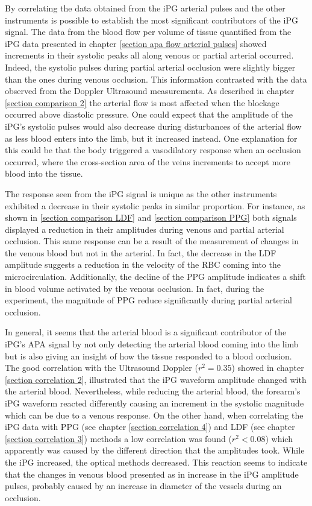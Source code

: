 By correlating the data obtained from the iPG arterial pulses and the other instruments is possible to establish the most significant contributors of the iPG signal. The data from the blood flow per volume of tissue quantified from the iPG data presented in chapter \ref{section apa flow arterial pulses} showed increments in their systolic peaks all along venous or partial arterial occurred. Indeed, the systolic pulses during partial arterial occlusion were slightly bigger than the ones during venous occlusion. This information contrasted with the data observed from the Doppler Ultrasound measurements. As described in chapter \ref{section comparison 2} the arterial flow is most affected when the blockage occurred above diastolic pressure. One could expect that the amplitude of the iPG's systolic pulses would also decrease during disturbances of the arterial flow as less blood enters into the limb, but it increased instead. One explanation for this could be that the body triggered a vasodilatory response when an occlusion occurred, where the cross-section area of the veins increments to accept more blood into the tissue. 

The response seen from the iPG signal is unique as the other instruments exhibited a decrease in their systolic peaks in similar proportion. For instance, as shown in \ref{section comparison LDF} and \ref{section comparison PPG} both signals displayed a reduction in their amplitudes during venous and partial arterial occlusion. This same response can be a result of the measurement of changes in the venous blood but not in the arterial. In fact, the decrease in the LDF amplitude suggests a reduction in the velocity of the RBC coming into the microcirculation. Additionally, the decline of the PPG amplitude indicates a shift in blood volume activated by the venous occlusion. In fact, during the experiment, the magnitude of PPG reduce significantly during partial arterial occlusion.

In general, it seems that the arterial blood is a significant contributor of the iPG's APA signal by not only detecting the arterial blood coming into the limb but is also giving an insight of how the tissue responded to a blood occlusion. The good correlation with the Ultrasound Doppler ($r^2 = 0.35$) showed in chapter \ref{section correlation 2}, illustrated that the iPG waveform amplitude changed with the arterial blood. Nevertheless, while reducing the arterial blood, the forearm's iPG waveform reacted differently causing an increment in the systolic magnitude which can be due to a venous response. On the other hand, when correlating the iPG data with PPG (see chapter \ref{section correlation 4}) and LDF (see chapter \ref{section correlation 3}) methods a low correlation was found ($r^2 < 0.08$) which apparently was caused by the different direction that the amplitudes took. While the iPG increased, the optical methods decreased. This reaction seems to indicate that the changes in venous blood presented as in increase in the iPG amplitude pulses, probably caused by an increase in diameter of the vessels during an occlusion. 

